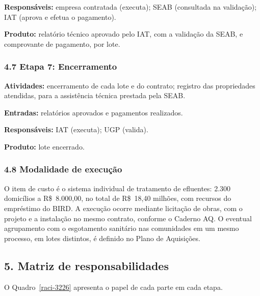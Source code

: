 \textbf{Responsáveis:} empresa contratada (executa); SEAB (consultada na validação); IAT (aprova e efetua o pagamento).

\textbf{Produto:} relatório técnico aprovado pelo IAT, com a validação da SEAB, e comprovante de pagamento, por lote.


\subsubsection*{4.7 Etapa 7: Encerramento}

\textbf{Atividades:} encerramento de cada lote e do contrato; registro das propriedades atendidas, para a assistência técnica prestada pela SEAB.

\textbf{Entradas:} relatórios aprovados e pagamentos realizados.

\textbf{Responsáveis:} IAT (executa); UGP (valida).

\textbf{Produto:} lote encerrado.

\subsubsection*{4.8 Modalidade de execução}

O item de custo é o sistema individual de tratamento de efluentes: 2.300 domicílios a R\$~8.000,00, no total de R\$~18,40 milhões, com recursos do empréstimo do BIRD. A execução ocorre mediante licitação de obras, com o projeto e a instalação no mesmo contrato, conforme o Caderno AQ. O eventual agrupamento com o esgotamento sanitário nas comunidades em um mesmo processo, em lotes distintos, é definido no Plano de Aquisições.

{}
\subsection*{5. Matriz de responsabilidades}

O Quadro~\ref{raci-3226} apresenta o papel de cada parte em cada etapa.

